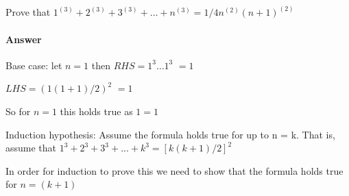 \documentclass{article}
\begin{document}
Prove that $1^(3) + 2^(3) + 3^(3) + \ldots + n^(3) = 1/4n^(2)(n + 1)^(2)$
\paragraph{Answer}

Base case: let $n=1$ then 
$RHS= 1^3 \ldots 1^3$
$=1$

$LHS= (1(1 + 1)/2)^2$
$=1$

So for $n=1$ this holds true as $1=1$

Induction hypothesis:
Assume the formula holds true for up to n = k. That is, assume that
$1^3 + 2^3 + 3^3 + ... + k^3 = [k(k + 1)/2]^2$

In order for induction to prove this we need to show that the formula holds 
true for $n=(k+1)$ 
\end{document}
